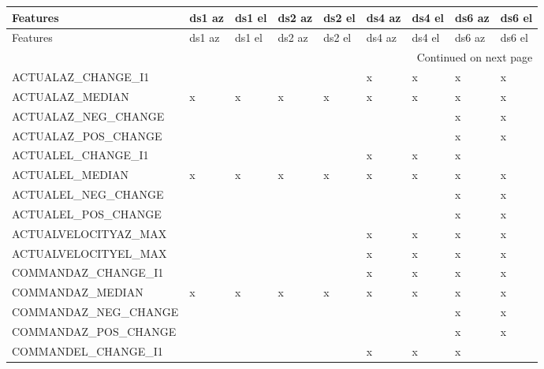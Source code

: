 \begin{longtable}{lllllllll}
\toprule
              Features & ds1 az & ds1 el & ds2 az & ds2 el & ds4 az & ds4 el & ds6 az & ds6 el \\
\midrule
\endfirsthead

\toprule
              Features & ds1 az & ds1 el & ds2 az & ds2 el & ds4 az & ds4 el & ds6 az & ds6 el \\
\midrule
\endhead
\midrule
\multicolumn{9}{r}{{Continued on next page}} \\
\midrule
\endfoot

\bottomrule
\endlastfoot
    ACTUALAZ\_CHANGE\_I1 &        &        &        &        &      x &      x &      x &      x \\
       ACTUALAZ\_MEDIAN &      x &      x &      x &      x &      x &      x &      x &      x \\
   ACTUALAZ\_NEG\_CHANGE &        &        &        &        &        &        &      x &      x \\
   ACTUALAZ\_POS\_CHANGE &        &        &        &        &        &        &      x &      x \\
    ACTUALEL\_CHANGE\_I1 &        &        &        &        &      x &      x &      x &        \\
       ACTUALEL\_MEDIAN &      x &      x &      x &      x &      x &      x &      x &      x \\
   ACTUALEL\_NEG\_CHANGE &        &        &        &        &        &        &      x &      x \\
   ACTUALEL\_POS\_CHANGE &        &        &        &        &        &        &      x &      x \\
  ACTUALVELOCITYAZ\_MAX &        &        &        &        &      x &      x &      x &      x \\
  ACTUALVELOCITYEL\_MAX &        &        &        &        &      x &      x &      x &      x \\
   COMMANDAZ\_CHANGE\_I1 &        &        &        &        &      x &      x &      x &      x \\
      COMMANDAZ\_MEDIAN &      x &      x &      x &      x &      x &      x &      x &      x \\
  COMMANDAZ\_NEG\_CHANGE &        &        &        &        &        &        &      x &      x \\
  COMMANDAZ\_POS\_CHANGE &        &        &        &        &        &        &      x &      x \\
   COMMANDEL\_CHANGE\_I1 &        &        &        &        &      x &      x &      x &        \\

\end{longtable}
